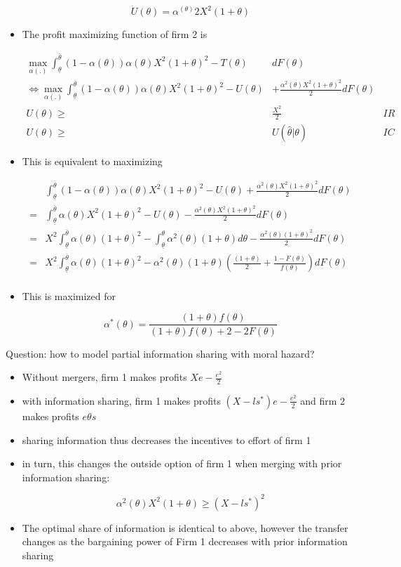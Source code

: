 \documentclass[a4paper]{article}
\renewcommand{\t}{\theta}
\renewcommand{\a}{\alpha}
\begin{document}
\begin{itemize}
    $$\dot U(\t)=\a^(\t)2 X^2(1+\t)$$
    
    \item The profit maximizing function of firm 2 is 
    
    \begin{equation}
        \begin{aligned}
       \max_{\a(.)}\int_{\underline \t}^{\overline \t}(1-\a(\t))\a(\t) X^2(1+\t)^2-T(\t)& dF(\t)&\\
       \iff \max_{\a(.)}\int_{\underline \t}^{\overline \t}(1-\a(\t))\a(\t) X^2(1+\t)^2-U(\t)&+\frac{\a^2(\t) X^2(1+\t)^2}{2} dF(\t)&\\
       U(\t)\geq& \frac{X^2}{2}&IR\\
       U(\t)\geq& U(\hat \t|\t)&IC
    \end{aligned}
    \end{equation}
    \item This is equivalent to maximizing

\begin{equation}
    \begin{aligned}
       &\int_{\underline \t}^{\overline \t}(1-\a(\t))\a(\t) X^2(1+\t)^2-U(\t)+\frac{\a^2(\t) X^2(1+\t)^2}{2} dF(\t)\\
       =&\int_{\underline \t}^{\overline \t}\a(\t) X^2(1+\t)^2-U(\t)-\frac{\a^2(\t) X^2(1+\t)^2}{2} dF(\t)\\
       =&X^2\int_{\underline \t}^{\overline \t}\a(\t) (1+\t)^2-\int_{\underline \t}^{\t}\a^2(\t)(1+\t)d\t-\frac{\a^2(\t) (1+\t)^2}{2} dF(\t)\\
       =&X^2\int_{\underline \t}^{\overline \t}\a(\t) (1+\t)^2-\a^2(\t)(1+\t)\left(\frac{(1+\t)}{2}+\frac{1-F(\t)}{f(\t)}\right) dF(\t)\\
\end{aligned}
\end{equation}
    \item This is maximized for 
    
    $$\a^*(\t)=\frac{(1+\t)f(\t)}{(1+\t)f(\t)+2-2F(\t)}$$
\end{itemize}




Question: how to model partial information sharing with moral hazard?

\begin{itemize}
    \item Without mergers, firm 1 makes profits $Xe-\frac{e^2}{2}$ 
    \item with information sharing, firm 1 makes profits $(X-ls^*)e-\frac{e^2}{2}$ and firm 2 makes profits $e\t s$
    \item sharing information thus decreases the incentives to effort of firm 1
    \item in turn, this changes the outside option of firm 1 when merging with prior information sharing:
    
    $$\a^2(\t) X^2(1+\t)\geq (X-ls^*)^2$$
    \item The optimal share of information is identical to above, however the transfer changes as the bargaining power of Firm 1 decreases with prior information sharing
\end{itemize}




\end{document}
